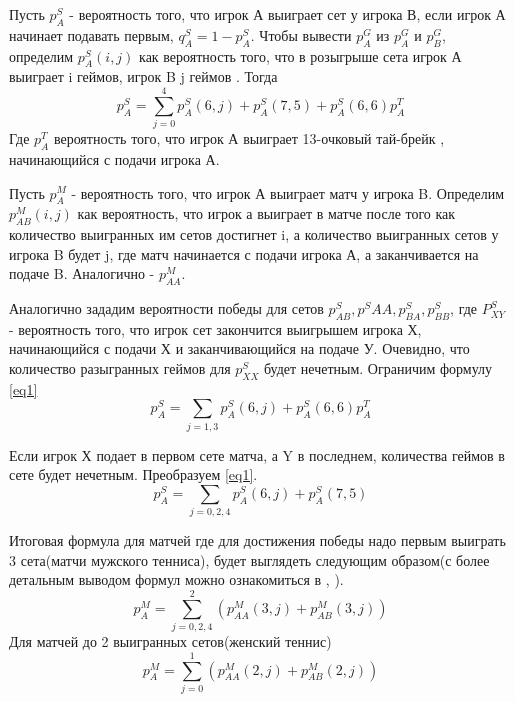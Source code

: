 Пусть $p_A^S$ - вероятность того, что игрок А выиграет сет у игрока В, если игрок А начинает подавать первым, $q_A^S=1 - p^S_A$. Чтобы вывести $p^G_A$ из $p^G_A$ и $p^G_B$, определим $p_A^S(i,j)$ как вероятность того, что в розыгрыше сета игрок А выиграет i геймов, игрок B j геймов . Тогда
\begin{equation}
p_A^S=\sum\limits^{4}_{j=0}{p_A^S(6,j)} + p^S_A(7,5) + p^S_A(6,6)p^T_A\label{eq1}
\end{equation}
Где $p^T_A$  вероятность того, что игрок А выиграет 13-очковый тай-брейк , начинающийся с подачи игрока А.


Пусть $p^M_A$ - вероятность того, что игрок А выиграет матч у игрока B. Определим $p_{AB}^M(i,j)$ как вероятность, что игрок а выиграет в матче после того как количество выигранных им сетов достигнет i, а количество выигранных сетов у игрока B будет j, где матч начинается с подачи игрока А, а заканчивается на подаче B. Аналогично - $p^M_{AA}$.

Аналогично зададим вероятности победы для сетов $p^S_{AB}, p^S{AA}, p^S_{BA}, p^S_{BB}$, где $P^S_{XY}$ - вероятность того, что игрок сет закончится выигрышем игрока Х, начинающийся с подачи Х и заканчивающийся на подаче У.
Очевидно, что количество разыгранных геймов для $p^S_{XX}$ будет нечетным. Ограничим формулу \eqref{eq1}
\begin{equation}
p_A^S=\sum\limits_{j=1,3}{p_A^S(6,j)}  + p^S_A(6,6)p^T_A
\end{equation}

Если игрок Х подает в первом сете матча, а Y в последнем, количества геймов в сете будет нечетным.
Преобразуем \eqref{eq1}.
\begin{equation}
p_A^S=\sum\limits_{j=0,2,4}{p_A^S(6,j)} + p^S_A(7,5) 
\end{equation}

Итоговая формула для матчей где для достижения победы надо первым выиграть 3 сета(матчи мужского тенниса), будет выглядеть следующим образом(с более детальным выводом формул можно ознакомиться в \cite{Book23}, \cite{Book09}).
\begin{equation}
p_A^M=\sum\limits^{2}_{j=0,2,4}{(p^M_{AA}(3,j) + p^M_{AB}(3,j))} 
\end{equation}
Для матчей до 2 выигранных сетов(женский теннис)
\begin{equation}
p_A^M=\sum\limits^{1}_{j=0}{(p^M_{AA}(2,j) + p^M_{AB}(2,j))} 
\end{equation}
